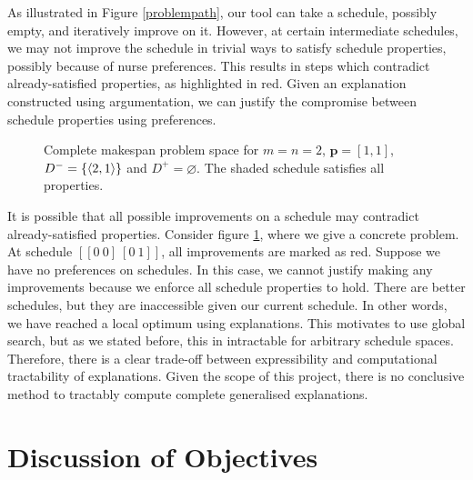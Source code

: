 As illustrated in Figure \ref{problempath}, our tool can take a schedule, possibly empty, and iteratively improve on it. However, at certain intermediate schedules, we may not improve the schedule in trivial ways to satisfy schedule properties, possibly because of nurse preferences. This results in steps which contradict already-satisfied properties, as highlighted in red. Given an explanation constructed using argumentation, we can justify the compromise between schedule properties using preferences.

\begin{figure}[H]
	\label{problemspace}
	
	\caption{Complete makespan problem space for $m=n=2$, $\mathbf{p}=[1,1]$, $D^-=\{\langle{2},{1}\rangle\}$ and $D^+=\varnothing$. The shaded schedule satisfies all properties.}
\end{figure}

It is possible that all possible improvements on a schedule may contradict already-satisfied properties. Consider figure \ref{problemspace}, where we give a concrete problem. At schedule $[[0\ 0]\ [0\ 1]]$, all improvements are marked as red. Suppose we have no preferences on schedules. In this case, we cannot justify making any improvements because we enforce all schedule properties to hold. There are better schedules, but they are inaccessible given our current schedule. In other words, we have reached a local optimum using explanations. This motivates to use global search, but as we stated before, this in intractable for arbitrary schedule spaces. Therefore, there is a clear trade-off between expressibility and computational tractability of explanations. Given the scope of this project, there is no conclusive method to tractably compute complete generalised explanations.

\section{Discussion of Objectives}

